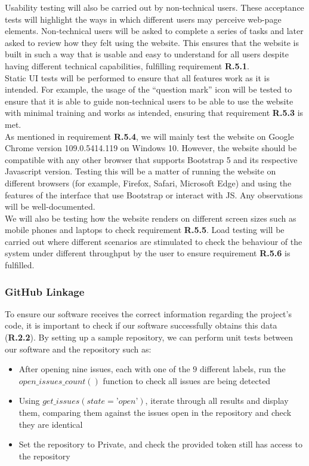 \documentclass[a4paper]{article}
\theoremstyle{plain}
\theoremstyle{definition}
\theoremstyle{remark}
\begin{document}
\noindent Usability testing will also be carried out by non-technical users. These acceptance tests will highlight the ways in which different users may perceive web-page elements. Non-technical users will be asked to complete a series of tasks and later asked to review how they felt using the website. This ensures that the website is built in such a way that is usable and easy to understand for all users despite having different technical capabilities, fulfilling requirement \textbf{R.5.1}.\\

\noindent Static UI tests will be performed to ensure that all features work as it is intended. For example, the usage of the “question mark” icon will be tested to ensure that it is able to guide non-technical users to be able to use the website with minimal training and works as intended, ensuring that requirement \textbf{R.5.3} is met.\\

\noindent As mentioned in requirement \textbf{R.5.4}, we will mainly test the website on Google Chrome version 109.0.5414.119 on Windows 10. However, the website should be compatible with any other browser that supports Bootstrap 5 and its respective Javascript version. Testing this will be a matter of running the website on different browsers (for example, Firefox, Safari, Microsoft Edge) and using the features of the interface that use Bootstrap or interact with JS. Any observations will be well-documented.\\

\noindent We will also be testing how the website renders on different screen sizes such as mobile phones and laptops to check requirement \textbf{R.5.5}. Load testing will be carried out where different scenarios are stimulated to check the behaviour of the system under different throughput by the user to ensure requirement \textbf{R.5.6} is fulfilled.
\subsubsection*{GitHub Linkage}
To ensure our software receives the correct information regarding the project's code, it is important to check if our software successfully obtains this data (\textbf{R.2.2}). By setting up a sample repository, we can perform unit tests between our software and the repository such as:
\begin{itemize}
	\item After opening nine issues, each with one of the $9$ different labels, run the $open\_issues\_count()$ function to check all issues are being detected
	\item Using $get\_issues(state=’open’)$, iterate through all results and display them, comparing them against the issues open in the repository and check they are identical
	\item Set the repository to Private, and check the provided token still has access to the repository 
\end{itemize}
\end{document}
